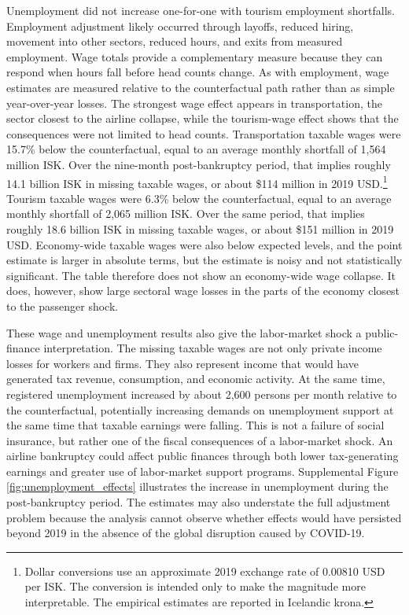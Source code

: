 \documentclass[12pt]{article}
\begin{document}
Unemployment did not increase one-for-one with tourism employment shortfalls. Employment adjustment likely occurred through layoffs, reduced hiring, movement into other sectors, reduced hours, and exits from measured employment. Wage totals provide a complementary measure because they can respond when hours fall before head counts change. As with employment, wage estimates are measured relative to the counterfactual path rather than as simple year-over-year losses. The strongest wage effect appears in transportation, the sector closest to the airline collapse, while the tourism-wage effect shows that the consequences were not limited to head counts. Transportation taxable wages were 15.7\% below the counterfactual, equal to an average monthly shortfall of 1,564 million ISK. Over the nine-month post-bankruptcy period, that implies roughly 14.1 billion ISK in missing taxable wages, or about \$114 million in 2019 USD.\footnote{Dollar conversions use an approximate 2019 exchange rate of 0.00810 USD per ISK. The conversion is intended only to make the magnitude more interpretable. The empirical estimates are reported in Icelandic krona.} Tourism taxable wages were 6.3\% below the counterfactual, equal to an average monthly shortfall of 2,065 million ISK. Over the same period, that implies roughly 18.6 billion ISK in missing taxable wages, or about \$151 million in 2019 USD. Economy-wide taxable wages were also below expected levels, and the point estimate is larger in absolute terms, but the estimate is noisy and not statistically significant. The table therefore does not show an economy-wide wage collapse. It does, however, show large sectoral wage losses in the parts of the economy closest to the passenger shock.

These wage and unemployment results also give the labor-market shock a public-finance interpretation. The missing taxable wages are not only private income losses for workers and firms. They also represent income that would have generated tax revenue, consumption, and economic activity. At the same time, registered unemployment increased by about 2,600 persons per month relative to the counterfactual, potentially increasing demands on unemployment support at the same time that taxable earnings were falling. This is not a failure of social insurance, but rather one of the fiscal consequences of a labor-market shock. An airline bankruptcy could affect public finances through both lower tax-generating earnings and greater use of labor-market support programs. Supplemental Figure \ref{fig:unemployment_effects} illustrates the increase in unemployment during the post-bankruptcy period. The estimates may also understate the full adjustment problem because the analysis cannot observe whether effects would have persisted beyond 2019 in the absence of the global disruption caused by COVID-19.
\end{document}

